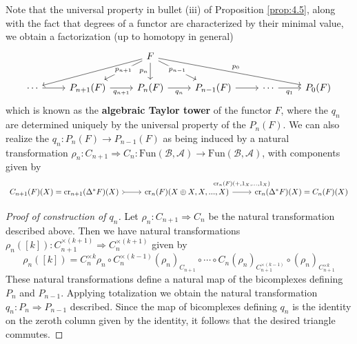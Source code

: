 Note that the universal property in bullet (iii) of Proposition \ref{prop:4.5}, along with the fact that degrees of a functor are characterized by their minimal value, we obtain a factorization (up to homotopy in general)
\[\begin{tikzcd}
	&& F \\
	\cdots & {P_{n+1}(F)} & {P_n(F)} & {P_{n-1}(F)} & \cdots & {P_0(F)}
	\arrow["{p_0}", from=1-3, to=2-6]
	\arrow["{q_1}"', from=2-5, to=2-6]
	\arrow["{p_n}"', from=1-3, to=2-3]
	\arrow["{p_{n-1}}"{description}, from=1-3, to=2-4]
	\arrow[from=2-4, to=2-5]
	\arrow["{q_n}"', from=2-3, to=2-4]
	\arrow["{p_{n+1}}"{description}, from=1-3, to=2-2]
	\arrow["{q_{n+1}}"', from=2-2, to=2-3]
	\arrow[from=1-3, to=2-1]
	\arrow[from=2-1, to=2-2]
\end{tikzcd}\]
which is known as the \textbf{algebraic Taylor tower} of the functor $F$, where the $q_n$ are determined uniquely by the universal property of the $P_n(F)$. We can also realize the $q_n:P_n(F)\rightarrow P_{n-1}(F)$ as being induced by a natural transformation $\rho_n:C_{n+1}\Rightarrow C_n:\text{Fun}(\mathcal{B},\mathcal{A})\rightarrow \text{Fun}(\mathcal{B},\mathcal{A})$, with components given by
\[\begin{tikzcd}
	{C_{n+1}(F)(X)=\text{cr}_{n+1}(\Delta^*F)(X)} & {\text{cr}_n(F)(X\oplus X,X,...,X)} & {\text{cr}_n(\Delta^*F)(X)=C_n(F)(X)}
	\arrow[tail, from=1-1, to=1-2]
	\arrow["{\text{cr}_n(F)(+,1_X,...,1_X)}", outer sep = 5pt, from=1-2, to=1-3]
\end{tikzcd}\]
\begin{proof}[Proof of construction of $q_n$]
    Let $\rho_n:C_{n+1}\Rightarrow C_n$ be the natural transformation described above. Then we have natural transformations $\rho_n([k]):C_{n+1}^{\times (k+1)}\Rightarrow C_n^{\times (k+1)}$ given by
    \begin{equation*}
        \rho_n([k]) = C_n^{\times k}\rho_n \circ C_n^{\times (k-1)}(\rho_n)_{C_{n+1}}\circ \cdots \circ C_n(\rho_n)_{C_{n+1}^{\times (k-1)}}\circ(\rho_n)_{C_{n+1}^{\times k}}
    \end{equation*}
    These natural transformations define a natural map of the bicomplexes defining $P_n$ and $P_{n-1}$. Applying totalization we obtain the natural transformation $q_n:P_n\Rightarrow P_{n-1}$ described. Since the map of bicomplexes defining $q_n$ is the identity on the zeroth column given by the identity, it follows that the desired triangle commutes.
\end{proof}


